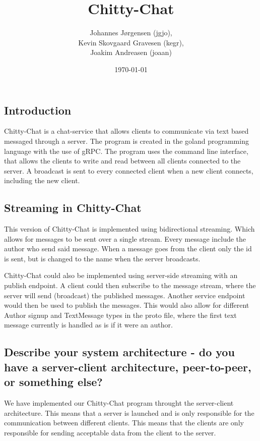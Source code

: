 \documentclass[a4paper,11pt]{article}
\title{Chitty-Chat}
\author{Johannes Jørgensen (jgjo),\\ Kevin Skovgaard Gravesen (kegr),\\ Joakim Andreasen (joaan)}
\date{\today}
\begin{document}
 

\maketitle

\subsection*{Introduction}
Chitty-Chat is a chat-service that allows clients to communicate via text based messaged through a server. The program is created in the goland programming language with the use of gRPC.
The program uses the command line interface, that allows the clients to write and read between all clients connected to the server.
A broadcast is sent to every connected client when a new client connects, including the new client.

\subsection*{Streaming in Chitty-Chat}
This version of Chitty-Chat is implemented using bidirectional streaming. Which allows for messages to be sent over a single stream.
Every message include the author who send said message. When a message goes from the client only the id is sent, but is changed to the name when the server broadcasts.

Chitty-Chat could also be implemented using server-side streaming with an publish endpoint.
A client could then subscribe to the message stream, where the server will send (broadcast) the published messages.
Another service endpoint would then be used to publish the messages.
This would also allow for different Author signup and TextMessage types in the proto file, where the first text message currently is handled as is if it were an author.

\subsection*{Describe your system architecture - do you have a server-client architecture, peer-to-peer, or something else?}
We have implemented our Chitty-Chat program throught the server-client architecture. 
This means that a server is launched and is only responsible for the communication between different clients. This means that the clients are only responsible for
sending acceptable data from the client to the server.
\end{document}
